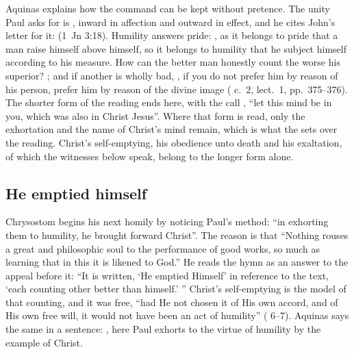 Aquinas explains how the command can be kept without pretence. The unity Paul
asks for is , inward in
affection and outward in effect, and he cites John's letter for it:
 (1~Jn 3:18).
Humility answers pride: , as it belongs to pride that a man raise himself above himself, so it
belongs to humility that he subject himself according to his measure. How can
the better man honestly count the worse his superior? ; and if another is wholly bad, , if you do not
prefer him by reason of his person, prefer him by reason of the divine image
( c.~2, lect.~1, pp.~375--376). The shorter form of
the reading ends here, with the call , ``let this mind be in you, which was also in Christ Jesus''.
Where that form is read, only the exhortation and the name of Christ's mind
remain, which is what the  sets over the reading. Christ's
self-emptying, his obedience unto death and his exaltation, of which the
witnesses below speak, belong to the longer form alone.

\subsection{He emptied himself}

Chrysostom begins his next homily by noticing Paul's method: ``in exhorting
them to humility, he brought forward Christ''. The reason is that ``Nothing
rouses a great and philosophic soul to the performance of good works, so much
as learning that in this it is likened to God.'' He reads the hymn as an answer
to the appeal before it: ``It is written, `He emptied Himself' in reference to
the text, `each counting other better than himself.' '' Christ's self-emptying
is the model of that counting, and it was free, ``had He not chosen it of His
own accord, and of His own free will, it would not have been an act of
humility'' ( 6--7). Aquinas says the same in a
sentence: , here
Paul exhorts to the virtue of humility by the example of Christ.

